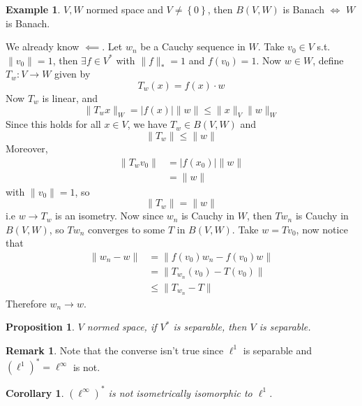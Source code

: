 \documentclass[11pt,a4paper]{article}
\theoremstyle{definition}
\newtheorem{example}[definition]{Example}
\newtheorem{remark}[definition]{Remark}
\theoremstyle{plain}
\newtheorem{proposition}[definition]{Proposition}
\newtheorem{corollary}[definition]{Corollary}
\theoremstyle{remark}
\renewcommand{\set}[1]{\left\{ #1 \right\}}
\newcommand{\abs}[1]{\lvert #1 \rvert}
\newcommand{\norm}[1]{\lVert #1 \rVert}
\newcommand{\1}{\mathbbm{1}}
\begin{document}
\begin{example}
    $V, W$ normed space and $V \ne \set{0}$, then $B(V, W)$ is Banach $\iff$ $W$ is Banach.    

    We already know $\impliedby$. Let $w_n$ be a Cauchy sequence in $W$. Take $v_0 \in V$ s.t. $\norm{v_0} = 1$, then $\exists f \in V^*$ with $\norm{f}_* = 1$ and 
    $f(v_0) = 1$. Now $w \in W$, define $T_w \colon V \to W$ given by 
    $$T_w (x) = f(x) \cdot w$$
    Now $T_w$ is linear, and 
    $$\norm{T_w x}_W = \abs{f(x)} \norm{w} \le \norm{x}_V \norm{w}_W$$
    Since this holds for all $x \in V$, we have $T_w \in B(V,W)$ and 
    $$\norm{T_w} \le \norm{w}$$
    Moreover, 
    \begin{align*}
        \norm{T_w v_0} &= \abs{f(x_0)} \norm{w} \\
        &= \norm{w}
    \end{align*}
    with $\norm{v_0} = 1$, so 
    $$\norm{T_w} = \norm{w}$$
    i.e $w \to T_w$ is an isometry. Now since $w_n$ is Cauchy in $W$, then $Tw_n$ is Cauchy in $B(V,W)$, so $Tw_n$ converges to some $T$ in $B(V,W)$. 
    Take $w = Tv_0$, now notice that 
    \begin{align*}
        \norm{w_n - w} &= \norm{f(v_0) w_n - f(v_0) w} \\
        &= \norm{T_{w_n} (v_0) - T (v_0)} \\
        &\le \norm{T_{w_n} - T} 
    \end{align*}
    Therefore $w_n \to w$.
\end{example}

\begin{proposition}
    $V$ normed space, if $V^*$ is separable, then $V$ is separable.
\end{proposition}

\begin{remark}
    Note that the converse isn't true since $\ell^1$ is separable and $(\ell^1)^* = \ell^\infty$ is not.
\end{remark}

\begin{corollary}
    $(\ell^\infty)^*$ is not isometrically isomorphic to $\ell^1$.
\end{corollary}
\end{document}
